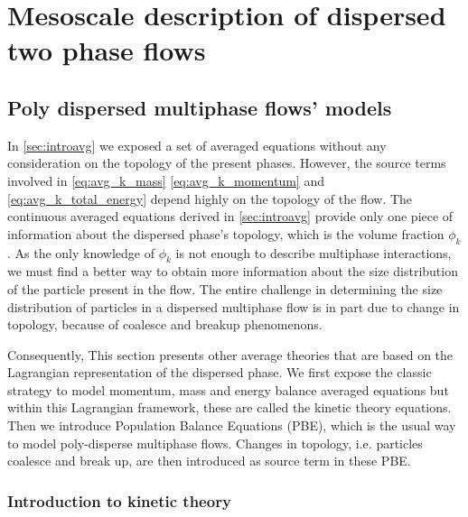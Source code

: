 \chapter{Mesoscale description of dispersed two phase flows}

\section{Poly dispersed multiphase flows' models}
\label{sec:PBE}

In \ref{sec:introavg} we exposed a set of averaged equations without any consideration on the topology of the present phases. 
However, the source terms involved in \ref{eq:avg_k_mass} \ref{eq:avg_k_momentum} and \ref{eq:avg_k_total_energy} depend highly on the topology of the flow. 
The continuous averaged equations derived in \ref{sec:introavg} provide only one piece of information about the dispersed phase's topology, which is the volume fraction $\phi_k$.
As the only knowledge of $\phi_k$ is not enough to describe multiphase interactions, we must find a better way to obtain more information about the size distribution of the particle present in the flow.
The entire challenge in determining the size distribution of particles in a dispersed multiphase flow is in part due to change in topology, because of coalesce and breakup phenomenons. 

Consequently, This section presents other average theories that are based on the Lagrangian representation of the dispersed phase. 
We first expose the classic strategy to model momentum, mass and energy balance averaged equations but within this Lagrangian framework, these are called the kinetic theory equations. 
Then we introduce Population Balance Equations (PBE), which is the usual way to model poly-disperse multiphase flows. 
Changes in topology, i.e. particles coalesce and break up, are then introduced as source term in these PBE. 


\subsection{Introduction to kinetic theory}

